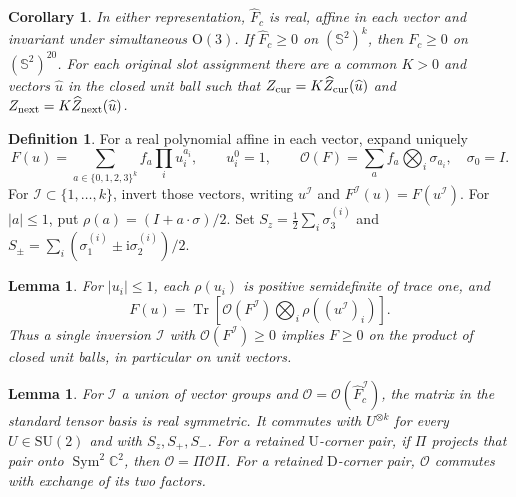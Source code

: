 \documentclass[11pt,reqno]{amsart}
\newtheorem{lemma}[theorem]{Lemma}
\newtheorem{corollary}[theorem]{Corollary}
\theoremstyle{definition}
\newtheorem{definition}[theorem]{Definition}
\theoremstyle{remark}
\begin{document}
\begin{corollary}\label{c:reduce}
In either representation, \(\widehat F_c\) is real, affine in
each vector and invariant under simultaneous \(\mathrm O(3)\).
If \(\widehat F_c\ge0\) on \((\mathbb S^2)^k\), then
\(F_c\ge0\) on \((\mathbb S^2)^{20}\).
For each original slot assignment there are a common \(K>0\)
and vectors \(\widehat u\) in the closed unit ball such that
\(Z_{\rm cur}=K\widehat Z_{\rm cur}(\widehat u)\) and
\(Z_{\rm next}=K\widehat Z_{\rm next}(\widehat u)\).
\end{corollary}

\begin{definition}\label{d:Pauli}
For a real polynomial affine in each vector, expand uniquely
\[
 F(u)=\sum_{a\in\{0,1,2,3\}^k}f_a\prod_i u_i^{a_i},
 \qquad u_i^0=1,\qquad
 \mathcal O(F)=\sum_a f_a\bigotimes_i\sigma_{a_i},\quad\sigma_0=I.
\]
For \(\mathcal I\subset\{1,\ldots,k\}\), invert those vectors,
writing \(u^{\mathcal I}\) and \(F^{\mathcal I}(u)=F(u^{\mathcal I})\).
For \(|a|\le1\), put \(\rho(a)=(I+a\cdot\sigma)/2\).
Set \(S_z=\frac12\sum_i\sigma_3^{(i)}\) and
\(S_\pm=\sum_i(\sigma_1^{(i)}\pm\mathrm i\sigma_2^{(i)})/2\).
\end{definition}

\begin{lemma}\label{l:inversion}
For \(|u_i|\le1\), each \(\rho(u_i)\) is positive semidefinite
of trace one, and
\[
 F(u)=\operatorname{Tr}\!\left[
      \mathcal O(F^{\mathcal I})
                 \bigotimes_i\rho((u^{\mathcal I})_i)\right].
\]
Thus a single inversion \(\mathcal I\) with
\(\mathcal O(F^{\mathcal I})\ge0\) implies \(F\ge0\)
on the product of closed unit balls, in particular on unit vectors.
\end{lemma}

\begin{lemma}\label{l:Ostruct}
For \(\mathcal I\) a union of vector groups and
\(\mathcal O=\mathcal O(\widehat F_c^{\mathcal I})\),
the matrix in the standard tensor basis is real symmetric.
It commutes with \(U^{\otimes k}\) for every \(U\in\mathrm{SU}(2)\)
and with \(S_z,S_+,S_-\).
For a retained \(\mathrm U\)-corner pair, if \(\Pi\) projects that
pair onto \(\operatorname{Sym}^2\mathbb C^2\), then
\(\mathcal O=\Pi\mathcal O\Pi\).
For a retained \(\mathrm D\)-corner pair, \(\mathcal O\) commutes
with exchange of its two factors.
\end{lemma}
\end{document}
